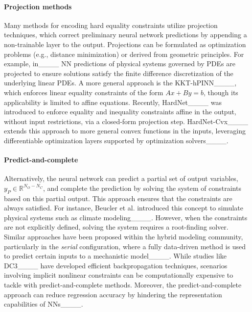 \paragraph{Projection methods}
Many methods for encoding hard equality constraints utilize projection techniques, which correct preliminary neural network predictions by appending a non-trainable layer to the output. Projections can be formulated as optimization problems (e.g., distance minimization) or derived from geometric principles. For example, in____ NN predictions of physical systems governed by PDEs are projected to ensure solutions satisfy the finite difference discretization of the underlying linear PDEs. A more general approach is the KKT-hPINN____, which enforces linear equality constraints of the form $Ax+By=b$, though its applicability is limited to affine equations. Recently, HardNet____ was introduced to enforce equality and inequality constraints affine in the output, without input restrictions, via a closed-form projection step. HardNet-Cvx____ extends this approach to more general convex functions in the inputs, leveraging differentiable optimization layers supported by optimization solvers____.

\paragraph{Predict-and-complete}
Alternatively, the neural network can predict a partial set of output variables, $y_P \in \mathbb{R}^{N_O - N_C}$, and complete the prediction by solving the system of constraints based on this partial output. This approach ensures that the constraints are always satisfied. For instance, Beucler et al. introduced this concept to simulate physical systems such as climate modeling____. However, when the constraints are not explicitly defined, solving the system requires a root-finding solver. Similar approaches have been proposed within the hybrid modeling community, particularly in the \textit{serial} configuration, where a fully data-driven method is used to predict certain inputs to a mechanistic model____. While studies like DC3____ have developed efficient backpropagation techniques, scenarios involving implicit nonlinear constraints can be computationally expensive to tackle with predict-and-complete methods. Moreover, the predict-and-complete approach can reduce regression accuracy by hindering the representation capabilities of NNs____.


